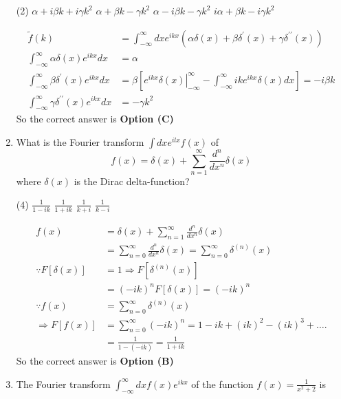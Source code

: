 \begin{enumerate}
	\begin{tasks}(2)
		\task[\textbf{A.}] $\alpha+i \beta k+i \gamma k^{2}$
		\task[\textbf{B.}] $\alpha+\beta k-\gamma k^{2}$
		\task[\textbf{C.}]  $\alpha-i \beta k-\gamma k^{2}$
		\task[\textbf{D.}] $i \alpha+\beta k-i \gamma k^{2}$
	\end{tasks}
\begin{answer}
	\begin{align*}
	\tilde{f}(k)&=\int_{-\infty}^{\infty} d x e^{i k x}\left(\alpha \delta(x)+\beta \delta^{\prime}(x)+\gamma \delta^{\prime \prime}(x)\right)\\
	\int_{-\infty}^{\infty} \alpha \delta(x) e^{i k x} d x&=\alpha\\
	\int_{-\infty}^{\infty} \beta \delta^{\prime}(x) e^{i k x} d x&=\beta\left[\left.e^{i k x} \delta(x)\right|_{-\infty} ^{\infty}-\int_{-\infty}^{\infty} i k e^{i k x} \delta(x) d x\right]=-i \beta k\\
	\int_{-\infty}^{\infty} \gamma \delta^{\prime \prime}(x) e^{i k x} d x&=-\gamma k^{2}
	\end{align*}
	So the correct answer is \textbf{Option (C)}
\end{answer}
	\item What is the Fourier transform $\int d x e^{i l x} f(x)$ of
	$$
	f(x)=\delta(x)+\sum_{n=1}^{\infty} \frac{d^{n}}{d x^{n}} \delta(x)
	$$
	where $\delta(x)$ is the Dirac delta-function?
	{}
	
	\begin{tasks}(4)
		\task[\textbf{A.}]  $\frac{1}{1-i k}$
		\task[\textbf{B.}] $\frac{1}{1+i k}$
		\task[\textbf{C.}] $\frac{1}{k+i}$
		\task[\textbf{D.}] $\frac{1}{k-i}$
	\end{tasks}
\begin{answer}
	\begin{align*}
	f(x)&=\delta(x)+\sum_{n=1}^{\infty} \frac{d^{n}}{d x^{n}} \delta(x)\\&=\sum_{n=0}^{\infty} \frac{d^{n}}{d x^{n}} \delta(x)=\sum_{n=0}^{\infty} \delta^{(n)}(x)\\
	\because F[\delta(x)]&=1 \Rightarrow F\left[\delta^{(n)}(x)\right]\\&=(-i k)^{n} F[\delta(x)]=(-i k)^{n}\\
	\because f(x)&=\sum_{n=0}^{\infty} \delta^{(n)}(x)\\
	\Rightarrow F[f(x)]&=\sum_{n=0}^{\infty}(-i k)^{n}=1-i k+(i k)^{2}-(i k)^{3}+\ldots .\\&=\frac{1}{1-(-i k)}=\frac{1}{1+i k}
	\end{align*}
	So the correct answer is \textbf{Option (B)}
\end{answer}
	\item The Fourier transform $\int_{-\infty}^{\infty} d x f(x) e^{i k x}$ of the function $f(x)=\frac{1}{x^{2}+2}$ is
	{}
	

\end{enumerate}
